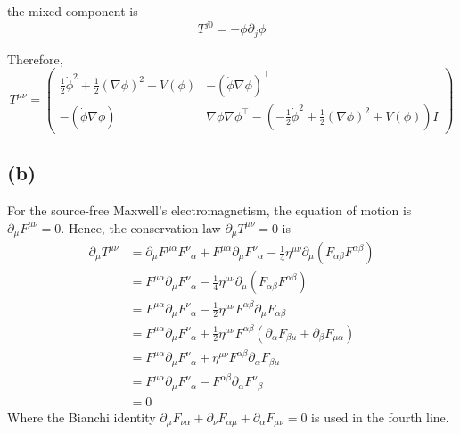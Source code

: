 \documentclass[a4paper,11pt]{article}
\begin{document}
the mixed component is
\begin{equation}
    T^{j0} = -\dot{\phi}\partial_j \phi
\end{equation}


Therefore,
\begin{equation}
    T^{\mu\nu} = \begin{pmatrix}
        \frac{1}{2}\dot{\phi}^2 + \frac{1}{2}(\nabla\phi)^2 + V(\phi) & -(\dot{\phi}\nabla\phi)^\top \\
        -(\dot{\phi}\nabla\phi) & \nabla\phi\nabla\phi^\top - \left(-\frac{1}{2}\dot{\phi}^2 + \frac{1}{2}(\nabla\phi)^2 + V(\phi)\right)I
    \end{pmatrix}
\end{equation}


\subsection{(b)}

For the source-free Maxwell's electromagnetism, the equation of motion is $\partial_\mu F^{\mu\nu} = 0$. Hence, the conservation law $\partial_\mu T^{\mu\nu} = 0$ is
\begin{align}
    \partial_\mu T^{\mu\nu} &= \partial_\mu F^{\mu\alpha}F^\nu{}_\alpha + F^{\mu\alpha}\partial_\mu F^\nu{}_\alpha - \frac{1}{4}\eta^{\mu\nu}\partial_\mu(F_{\alpha\beta}F^{\alpha\beta}) \\
    &= F^{\mu\alpha}\partial_\mu F^\nu{}_\alpha - \frac{1}{4}\eta^{\mu\nu}\partial_\mu(F_{\alpha\beta}F^{\alpha\beta}) \\
    &= F^{\mu\alpha}\partial_\mu F^\nu{}_\alpha - \frac{1}{2}\eta^{\mu\nu}F^{\alpha\beta}\partial_\mu F_{\alpha\beta} \\
    &= F^{\mu\alpha}\partial_\mu F^\nu{}_\alpha + \frac{1}{2}\eta^{\mu\nu}F^{\alpha\beta}(\partial_\alpha F_{\beta\mu} + \partial_\beta F_{\mu\alpha}) \\
    &= F^{\mu\alpha}\partial_\mu F^\nu{}_\alpha +\eta^{\mu\nu}F^{\alpha\beta}\partial_\alpha F_{\beta\mu} \\
    &= F^{\mu\alpha}\partial_\mu F^\nu{}_\alpha -F^{\alpha\beta}\partial_\alpha F^{\nu}{}_{\beta} \\
    &= 0
\end{align}
Where the Bianchi identity $\partial_\mu F_{\nu\alpha} + \partial_\nu F_{\alpha\mu} + \partial_\alpha F_{\mu\nu} = 0$ is used in the fourth line.
\end{document}
